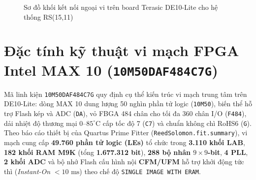 \begin{figure}[!htb]
{%
    }
    \caption{Sơ đồ khối kết nối ngoại vi trên board Terasic DE10-Lite cho hệ thống RS(15,11)}
    \label{fig:de10-overview}
\end{figure}

\section{Đặc tính kỹ thuật vi mạch FPGA Intel MAX 10 (\texttt{10M50DAF484C7G})}
\label{sec:max10-spec}

Mã linh kiện \texttt{10M50DAF484C7G} quy định cụ thể kiến trúc vi mạch trung tâm trên DE10-Lite: dòng MAX 10 dung lượng 50 nghìn phần tử logic (\texttt{10M50}), biến thể hỗ trợ Flash kép và ADC (\texttt{DA}), vỏ FBGA 484 chân cho tối đa 360 chân I/O (\texttt{F484}), dải nhiệt độ thương mại $0\text{--}85^{\circ}\text{C}$ cấp tốc độ 7 (\texttt{C7}) và chuẩn không chì RoHS6 (\texttt{G}). Theo báo cáo thiết bị của Quartus Prime Fitter (\texttt{ReedSolomon.fit.summary}), vi mạch cung cấp \textbf{49.760 phần tử logic (LEs)} tổ chức trong \textbf{3.110 khối LAB}, \textbf{182 khối RAM M9K} (tổng \textbf{1.677.312 bit}), \textbf{288 bộ nhân $9\times 9$-bit}, \textbf{4 PLL}, \textbf{2 khối ADC} và bộ nhớ Flash cấu hình nội \textbf{CFM/UFM} hỗ trợ khởi động tức thì (\textit{Instant-On} $<10\text{ ms}$) theo chế độ \texttt{SINGLE IMAGE WITH ERAM}.

